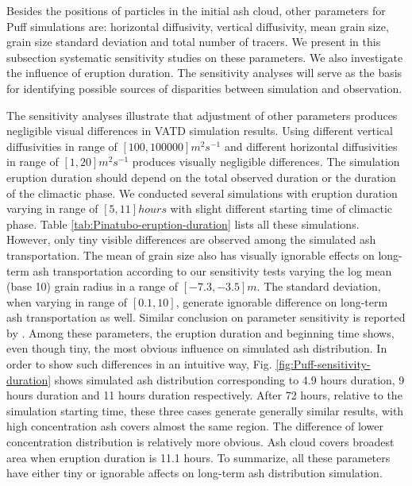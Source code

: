 \documentclass[draft,linenumbers]{agujournal2019}
\begin{document}
Besides the positions of particles in the initial ash cloud, other parameters for Puff simulations are: horizontal diffusivity, vertical diffusivity, mean grain size, grain size standard deviation and total number of tracers. We present in this subsection systematic sensitivity studies on these parameters. We also investigate the influence of eruption duration.  The sensitivity analyses will serve as the basis for identifying possible sources of disparities between simulation and observation.

The sensitivity analyses illustrate that adjustment of other parameters produces negligible visual differences in VATD simulation results. Using different vertical diffusivities in range of $[100, 100000] m^2s^{-1} $ and different horizontal diffusivities in range of $[1, 20] m^2s^{-1}$ produces visually negligible differences.  The simulation eruption duration should depend on the total observed duration or the duration of the climactic phase. We conducted several simulations with eruption duration varying in range of $[5, 11] hours$ with slight different starting time of climactic phase. Table \ref{tab:Pinatubo-eruption-duration} lists all these simulations. However, only tiny visible differences are observed among the simulated ash transportation. The mean of grain size also has visually ignorable effects on long-term ash transportation according to our sensitivity tests varying the log mean (base 10) grain radius in a range of $[-7.3, -3.5] m$.  The standard deviation, when varying in range of $[0.1, 10]$, generate ignorable difference on long-term ash transportation as well. Similar conclusion on parameter sensitivity is reported by \citet[e.g.][]{fero2008simulation, daniele2009applications}.  Among these parameters, the eruption duration and beginning time shows, even though tiny, the most obvious influence on simulated ash distribution. In order to show such differences in an intuitive way, Fig. \ref{fig:Puff-sensitivity-duration} shows simulated ash distribution corresponding to 4.9 hours duration, 9 hours duration and 11 hours duration respectively. After 72 hours, relative to the simulation starting time, these three cases generate generally similar results, with high concentration ash covers almost the same region. The difference of lower concentration distribution is relatively more obvious. Ash cloud covers broadest area when eruption duration is 11.1 hours. To summarize, all these parameters have either tiny or ignorable affects on long-term ash distribution simulation.
\end{document}
